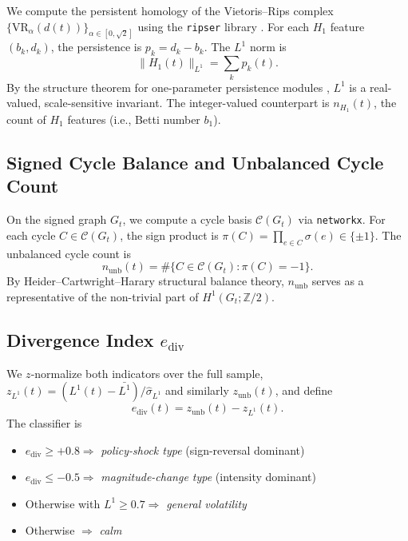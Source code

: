 \documentclass[11pt]{article}
\begin{document}
We compute the persistent homology of the Vietoris--Rips complex
$\{\mathrm{VR}_\alpha(d(t))\}_{\alpha \in [0, \sqrt{2}]}$ using the \texttt{ripser}
library \cite{tralie2018ripser}. For each $H_1$ feature $(b_k, d_k)$, the
persistence is $p_k = d_k - b_k$. The $L^1$ norm is
\begin{equation}
\|H_1(t)\|_{L^1} = \sum_k p_k(t).
\end{equation}
By the structure theorem for one-parameter persistence modules
\cite{crawleyboevey2015decomposition}, $L^1$ is a real-valued, scale-sensitive
invariant. The integer-valued counterpart is $n_{H_1}(t)$, the count of
$H_1$ features (i.e., Betti number $b_1$).

\subsection{Signed Cycle Balance and Unbalanced Cycle Count}

On the signed graph $G_t$, we compute a cycle basis $\mathcal{C}(G_t)$ via
\texttt{networkx}. For each cycle $C \in \mathcal{C}(G_t)$, the sign product is
$\pi(C) = \prod_{e \in C} \sigma(e) \in \{\pm 1\}$. The unbalanced cycle count is
\begin{equation}
n_{\mathrm{unb}}(t) = \#\{C \in \mathcal{C}(G_t) : \pi(C) = -1\}.
\end{equation}
By Heider--Cartwright--Harary structural balance theory, $n_{\mathrm{unb}}$
serves as a representative of the non-trivial part of $H^1(G_t; \mathbb{Z}/2)$.

\subsection{Divergence Index $e_{\mathrm{div}}$}

We $z$-normalize both indicators over the full sample,
$z_{L^1}(t) = (L^1(t) - \bar{L^1})/\hat{\sigma}_{L^1}$ and similarly $z_{\text{unb}}(t)$,
and define
\begin{equation}
e_{\mathrm{div}}(t) = z_{\text{unb}}(t) - z_{L^1}(t).
\end{equation}
The classifier is
\begin{itemize}
  \item $e_{\mathrm{div}} \geq +0.8 \Rightarrow$ \emph{policy-shock type}
        (sign-reversal dominant)
  \item $e_{\mathrm{div}} \leq -0.5 \Rightarrow$ \emph{magnitude-change type}
        (intensity dominant)
  \item Otherwise with $L^1 \geq 0.7 \Rightarrow$ \emph{general volatility}
  \item Otherwise $\Rightarrow$ \emph{calm}
\end{itemize}
\end{document}
